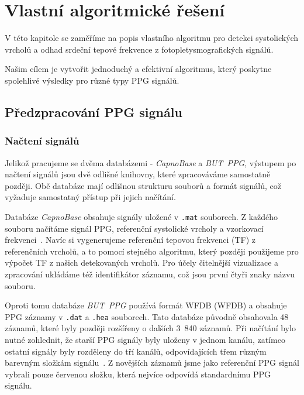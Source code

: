 \chapter{Vlastní algoritmické řešení}
\label{ch:VlastniAlg}

V této kapitole se zaměříme na popis vlastního algoritmu pro detekci systolických vrcholů a odhad srdeční tepové frekvence z fotopletysmografických signálů.

Našim cílem je vytvořit jednoduchý a efektivní algoritmus, který poskytne spolehlivé výsledky pro různé typy PPG signálů.

\section{Předzpracování PPG signálu}
\label{sec:alg_preproc}

\subsection*{Načtení signálů}
\label{sec:alg_load}
Jelikož pracujeme se dvěma databázemi - \emph{CapnoBase} a \emph{BUT~PPG}, výstupem po načtení signálů jsou dvě odlišné knihovny, které zpracováváme samostatně později.
Obě databáze mají odlišnou strukturu souborů a formát signálů, což vyžaduje samostatný přístup při jejich načítání.

Databáze \emph{CapnoBase} obsahuje signály uložené v \texttt{.mat} souborech.
Z každého souboru načítáme signál PPG, referenční systolické vrcholy a vzorkovací frekvenci~\cite{CapnoBase}.
Navíc si vygenerujeme referenční tepovou frekvenci (TF) z referenčních vrcholů, a to pomocí stejného algoritmu, který později použijeme pro výpočet TF z našich detekovaných vrcholů.
Pro účely čitelnější vizualizace a zpracování ukládáme též identifikátor záznamu, což jsou první čtyři znaky názvu souboru.

Oproti tomu databáze \emph{BUT~PPG} používá formát \acl{WFDB} (\acs{WFDB}) a obsahuje PPG záznamy v \texttt{.dat} a \texttt{.hea} souborech.
Tato databáze původně obsahovala 48 záznamů, které byly později rozšířeny o dalších 3~840 záznamů.
Při načítání bylo nutné zohlednit, že starší PPG signály byly uloženy v jednom kanálu, zatímco ostatní signály byly rozděleny do tří kanálů, odpovídajících třem různým barevným složkám signálu~\cite{BUT_PPG_database}.
Z novějších záznamů jsme jako referenční PPG signál vybrali pouze červenou složku, která nejvíce odpovídá standardnímu PPG signálu.

